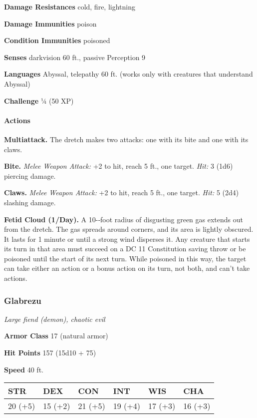 \documentclass[
]{article}
\begin{document}
\textbf{Damage Resistances} cold, fire, lightning

\textbf{Damage Immunities} poison

\textbf{Condition Immunities} poisoned

\textbf{Senses} darkvision 60 ft., passive Perception 9

\textbf{Languages} Abyssal, telepathy 60 ft. (works only with creatures
that understand Abyssal)

\textbf{Challenge} ¼ (50 XP)

\hypertarget{actions-2}{%
\paragraph{Actions}\label{actions-2}}

\textbf{Multiattack.} The dretch makes two attacks: one with its bite
and one with its claws.

\textbf{Bite.} \emph{Melee Weapon Attack:} +2 to hit, reach 5 ft., one
target. \emph{Hit:} 3 (1d6) piercing damage.

\textbf{Claws.} \emph{Melee Weapon Attack:} +2 to hit, reach 5 ft., one
target. \emph{Hit:} 5 (2d4) slashing damage.

\textbf{Fetid Cloud (1/Day).} A 10-­‐foot radius of disgusting green gas
extends out from the dretch. The gas spreads around corners, and its
area is lightly obscured. It lasts for 1 minute or until a strong wind
disperses it. Any creature that starts its turn in that area must
succeed on a DC 11 Constitution saving throw or be poisoned until the
start of its next turn. While poisoned in this way, the target can take
either an action or a bonus action on its turn, not both, and can't take
actions.

\hypertarget{glabrezu}{%
\subsubsection{Glabrezu}\label{glabrezu}}

\emph{Large fiend (demon), chaotic evil}

\textbf{Armor Class} 17 (natural armor)

\textbf{Hit Points} 157 (15d10 + 75)

\textbf{Speed} 40 ft.

\begin{longtable}[]{@{}llllll@{}}
\toprule
STR & DEX & CON & INT & WIS & CHA\tabularnewline
\midrule
\endhead
20 (+5) & 15 (+2) & 21 (+5) & 19 (+4) & 17 (+3) & 16 (+3)\tabularnewline
\bottomrule
\end{longtable}
\end{document}
